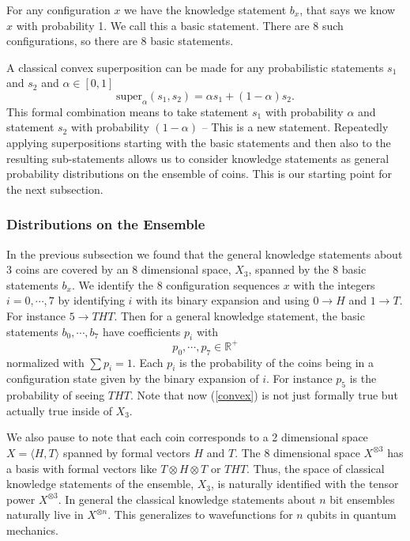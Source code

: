 \documentclass[12pt,a4paper]{article}
\begin{document}
For any configuration $x$ we have the knowledge statement $b_x$, that says we know $x$ with probability 1.  We call this a basic statement.  There are 8 such configurations, so there are 8 basic statements.

A classical convex superposition can be made for any probabilistic statements $s_1$ and $s_2$ and $\alpha \in [0,1]$
\begin{equation}
  \label{convex}
\text{super}_\alpha(s_1,s_2) = \alpha s_1 + (1 -\alpha) s_2.
\end{equation}
This formal combination means to take statement $s_1$ with probability $\alpha$ and statement $s_2$ with probability $(1-\alpha)$ --  This is a new statement.  Repeatedly applying superpositions starting with the basic statements and then also to the resulting sub-statements allows us to consider knowledge statements as general probability distributions on the ensemble of coins.  This is our starting point for the next subsection.

\subsubsection{Distributions on the Ensemble}
In the previous subsection we found that the general knowledge statements about 3 coins are covered by an 8 dimensional space, $X_3$, spanned by the 8 basic statements $b_x$.  We identify the 8 configuration sequences $x$ with the integers $i=0,\cdots,7$ by identifying $i$ with its binary expansion and using $0 \rightarrow H$ and $1 \rightarrow T$.  For instance $5 \rightarrow THT$.  Then for a general knowledge statement, the basic statements $b_0, \cdots, b_7$ have coefficients $p_i$ with
\[
  p_0,\cdots,p_{7} \in \mathbb{R}^+
\]
normalized with $\sum p_i = 1$.  Each $p_i$ is the probability of the coins being in a configuration state given by the binary expansion of $i$. For instance $p_5$ is the probability of seeing $THT$.  Note that now (\ref{convex}) is not just formally true but actually true inside of $X_3$.

We also  pause to note that each coin corresponds to a 2 dimensional space $X = \langle H, T \rangle$ spanned by formal vectors $H$ and $T$.  The 8 dimensional space $X ^ {\otimes 3}$ has a basis with formal vectors like $T \otimes H \otimes T$ or $THT$.  Thus, the space of classical knowledge statements of the ensemble, $X_3$, is naturally identified with the tensor power $X^{\otimes 3}$.  In general the classical knowledge statements about $n$ bit ensembles naturally live in $X ^ {\otimes n}$.  This generalizes to wavefunctions for $n$ qubits in quantum mechanics.
\end{document}
